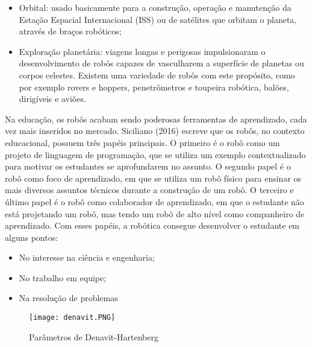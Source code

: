 \begin{itemize}
	\item Orbital: usado basicamente para a construção, operação e manutenção da Estação Espacial Internacional (ISS) ou de satélites que orbitam o planeta, através de braços robóticos;
	
	\item Exploração planetária: viagens longas e perigosas impulsionaram o desenvolvimento de robôs capazes de vasculharem a superfície de planetas ou corpos celestes. Existem uma variedade de robôs com este propósito, como por exemplo rovers e hoppers, penetrômetros e toupeira robótica, balões, dirigíveis e aviões. 
\end{itemize}

Na educação, os robôs acabam sendo poderosas ferramentas de aprendizado, cada vez mais inseridos no mercado. Siciliano (2016) escreve que os robôs, no contexto educacional, possuem três papéis principais. O primeiro é o robô como um projeto de linguagem de programação, que se utiliza um exemplo contextualizado para motivar os estudantes se aprofundarem no assunto. O segundo papel é o robô como foco de aprendizado, em que se utiliza um robô físico para ensinar os mais diversos assuntos técnicos durante a construção de um robô. O terceiro e último papel é o robô como colaborador de aprendizado, em que o estudante não está projetando um robô, mas tendo um robô de alto nível como companheiro de aprendizado. Com esses papéis, a robótica consegue desenvolver o estudante em alguns pontos: 

\begin{itemize}
	\item No interesse na ciência e engenharia;
	
	\item No trabalho em equipe;
	
	\item Na resolução de problemas 
\end{itemize}


\begin{figure}[h!]												
	\centering												
	\texttt{[image: denavit.PNG]}			
	\caption{Parâmetros de Denavit-Hartenberg}		
	\label{img:denavit}	
\end{figure}

